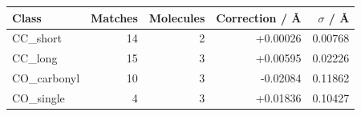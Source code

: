 \begin{tabular}{lrrrr}
\toprule
Class & Matches & Molecules & Correction / \AA{} & $\sigma$ / \AA{} \\
\midrule
CC\_short & 14 & 2 & +0.00026 & 0.00768 \\
CC\_long & 15 & 3 & +0.00595 & 0.02226 \\
CO\_carbonyl & 10 & 3 & -0.02084 & 0.11862 \\
CO\_single & 4 & 3 & +0.01836 & 0.10427 \\
\bottomrule
\end{tabular}
